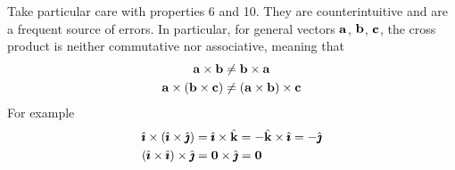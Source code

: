 \begin{warning}\label{warning:GEOMcross} 
Take particular care with properties 6 and 10. They are 
counterintuitive and are a frequent source of errors. In particular, 
for general vectors $\mathbf{a}$, $\mathbf{b}$, $\mathbf{c}$, the cross product is neither
commutative nor associative, meaning that
\begin{align*}
\mathbf{a}\times\mathbf{b}&\ne\mathbf{b}\times\mathbf{a}\\
\mathbf{a}\times(\mathbf{b}\times\mathbf{c})&\ne (\mathbf{a}\times\mathbf{b})\times\mathbf{c}
\end{align*} 
For example
\begin{align*}
\hat{\pmb{\imath}}\times(\hat{\pmb{\imath}}\times\hat{\pmb{\jmath}})
&=\hat{\pmb{\imath}}\times\hat{\mathbf{k}}=-\hat{\mathbf{k}}\times\hat{\pmb{\imath}} =-\hat{\pmb{\jmath}}\\
(\hat{\pmb{\imath}}\times \hat{\pmb{\imath}})\times\hat{\pmb{\jmath}}&= \mathbf{0} \times\hat{\pmb{\jmath}}=\mathbf{0}\\
\end{align*} 
\end{warning}

